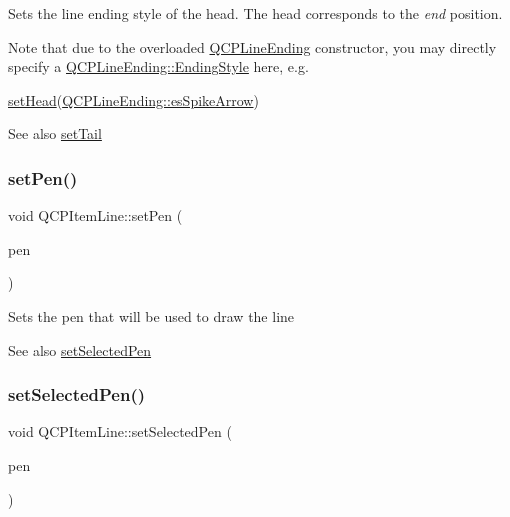 Sets the line ending style of the head. The head corresponds to the {\itshape end} position.

Note that due to the overloaded \hyperlink{class_q_c_p_line_ending}{Q\+C\+P\+Line\+Ending} constructor, you may directly specify a \hyperlink{class_q_c_p_line_ending_a5ef16e6876b4b74959c7261d8d4c2cd5}{Q\+C\+P\+Line\+Ending\+::\+Ending\+Style} here, e.\+g.
\begin{DoxyCode}
\hyperlink{class_q_c_p_item_line_aebf3d687114d584e0459db6759e2c3c3}{setHead}(\hyperlink{class_q_c_p_line_ending_a5ef16e6876b4b74959c7261d8d4c2cd5ab9964d0d03f812d1e79de15edbeb2cbf}{QCPLineEnding::esSpikeArrow}) 
\end{DoxyCode}


\begin{DoxySeeAlso}{See also}
\hyperlink{class_q_c_p_item_line_ac264222c3297a7efe33df9345c811a5f}{set\+Tail} 
\end{DoxySeeAlso}
\mbox{\label{class_q_c_p_item_line_a572528dab61c1abe205822fbd5db4b27}} 
\subsubsection{\texorpdfstring{set\+Pen()}{setPen()}}
{\footnotesize\ttfamily void Q\+C\+P\+Item\+Line\+::set\+Pen (\begin{DoxyParamCaption}\item[{const Q\+Pen \&}]{pen }\end{DoxyParamCaption})}

Sets the pen that will be used to draw the line

\begin{DoxySeeAlso}{See also}
\hyperlink{class_q_c_p_item_line_a3e2fec44503277e77717e9c24f87f1ea}{set\+Selected\+Pen} 
\end{DoxySeeAlso}
\mbox{\label{class_q_c_p_item_line_a3e2fec44503277e77717e9c24f87f1ea}} 
\subsubsection{\texorpdfstring{set\+Selected\+Pen()}{setSelectedPen()}}
{\footnotesize\ttfamily void Q\+C\+P\+Item\+Line\+::set\+Selected\+Pen (\begin{DoxyParamCaption}\item[{const Q\+Pen \&}]{pen }\end{DoxyParamCaption})}

